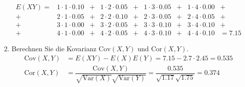 \begin{enumerate}[1.]
        \begin{equation*}
            \begin{array}{rcccccccl}
                E(XY) =& 1 \cdot 1 \cdot 0.10 &+& 1 \cdot 2 \cdot 0.05 &+& 1 \cdot 3 \cdot 0.05 &+& 1 \cdot 4 \cdot 0.00 &+ \\[5pt]
                      +& 2 \cdot 1 \cdot 0.05 &+& 2 \cdot 2 \cdot 0.10 &+& 2 \cdot 3 \cdot 0.05 &+& 2 \cdot 4 \cdot 0.05 &+ \\[5pt]
                      +& 3 \cdot 1 \cdot 0.00 &+& 3 \cdot 2 \cdot 0.05 &+& 3 \cdot 3 \cdot 0.10 &+& 3 \cdot 4 \cdot 0.10 &+ \\[5pt]
                      +& 4 \cdot 1 \cdot 0.00 &+& 4 \cdot 2 \cdot 0.05 &+& 4 \cdot 3 \cdot 0.10 &+& 4 \cdot 4 \cdot 0.10 &= 7.15
            \end{array}
        \end{equation*}
    \item Berechnen Sie die Kovarianz $\text{Cov}(X, Y)$ und $\text{Cor}(X, Y)$.
        \begin{align*}
            \text{Cov}(X, Y) &= E(XY) - E(X)E(Y) = 7.15 - 2.7 \cdot 2.45 = 0.535 \\[5pt]
            \text{Cor}(X, Y) &= \dfrac{\text{Cov}(X, Y)}{\sqrt{\text{Var}(X)}\sqrt{\text{Var}(Y)}} = \dfrac{0.535}{\sqrt{1.17}\sqrt{1.75}} = 0.374
        \end{align*}
\end{enumerate}
